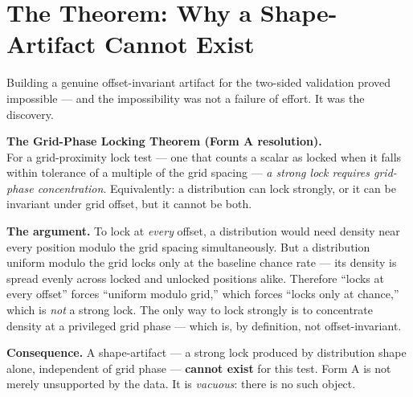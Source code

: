\documentclass[11pt, letterpaper, openany]{book}
\begin{document}
\section{The Theorem: Why a Shape-Artifact Cannot Exist}

Building a genuine offset-invariant artifact for the two-sided validation proved
impossible --- and the impossibility was not a failure of effort. It was the
discovery.

\begin{theorybox}
\textbf{The Grid-Phase Locking Theorem (Form A resolution).}\\[0.4em]
For a grid-proximity lock test --- one that counts a scalar as locked when it falls
within tolerance of a multiple of the grid spacing --- \emph{a strong lock requires
grid-phase concentration}. Equivalently: a distribution can lock strongly, or it can
be invariant under grid offset, but it cannot be both.

\textbf{The argument.} To lock at \emph{every} offset, a distribution would need
density near every position modulo the grid spacing simultaneously. But a
distribution uniform modulo the grid locks only at the baseline chance rate --- its
density is spread evenly across locked and unlocked positions alike. Therefore
``locks at every offset'' forces ``uniform modulo grid,'' which forces ``locks only
at chance,'' which is \emph{not} a strong lock. The only way to lock strongly is to
concentrate density at a privileged grid phase --- which is, by definition, not
offset-invariant.

\textbf{Consequence.} A shape-artifact --- a strong lock produced by distribution
shape alone, independent of grid phase --- \textbf{cannot exist} for this test.
Form A is not merely unsupported by the data. It is \emph{vacuous}: there is no such
object.
\end{theorybox}
\end{document}
